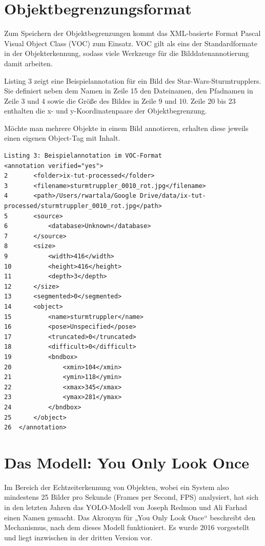 \section{Objektbegrenzungsformat}

Zum Speichern der Objektbegrenzungen kommt das XML-basierte Format Pascal ­Visual Object Class (VOC) zum Einsatz. VOC gilt als eins der Standardformate in der Objekt­erkennung, sodass viele Werkzeuge für die Bilddatenannotierung damit arbeiten.  

Listing 3 zeigt eine Beispielannotation für ein Bild des Star-Wars-Sturmtrupplers. Sie definiert neben dem Namen in Zeile 15 den Dateinamen, den Pfadnamen in Zeile 3 und 4 sowie die Größe des Bildes in Zeile 9 und 10. 
Zeile 20 bis 23 enthalten die x- und y-Koordinatenpaare der Objektbegrenzung. 

Möchte man mehrere Objekte in einem Bild annotieren, erhalten diese jeweils einen eigenen Object-Tag mit Inhalt. 

\begin{lstlisting}
Listing 3: Beispielannotation im VOC-Format 
<annotation verified="yes">
2       <folder>ix-tut-processed</folder>
3       <filename>sturmtruppler_0010_rot.jpg</filename>
4       <path>/Users/rwartala/Google Drive/data/ix-tut-processed/sturmtruppler_0010_rot.jpg</path>
5       <source>
6           <database>Unknown</database>
7       </source>
8       <size>
9           <width>416</width>
10          <height>416</height>
11          <depth>3</depth>
12      </size>
13      <segmented>0</segmented>
14      <object>
15          <name>sturmtruppler</name>
16          <pose>Unspecified</pose>
17          <truncated>0</truncated>
18          <difficult>0</difficult>
19          <bndbox>
20              <xmin>104</xmin>
21              <ymin>118</ymin>
22              <xmax>345</xmax>
23              <ymax>281</ymax>
24          </bndbox>
25      </object>
26  </annotation>
\end{lstlisting}

\section{Das Modell: You Only Look Once}

Im Bereich der Echtzeiterkennung von Objekten, wobei ein System also mindestens 25 Bilder pro Sekunde (Frames per Second, FPS) analysiert, hat sich in den letzten Jahren das YOLO-Modell von Joseph Redmon und Ali Farhad einen Namen gemacht. Das Akronym für „You Only Look Once“ beschreibt den Mechanismus, nach dem dieses Modell funktioniert. Es wurde 2016 vorgestellt und liegt inzwischen in der dritten Version vor. 

